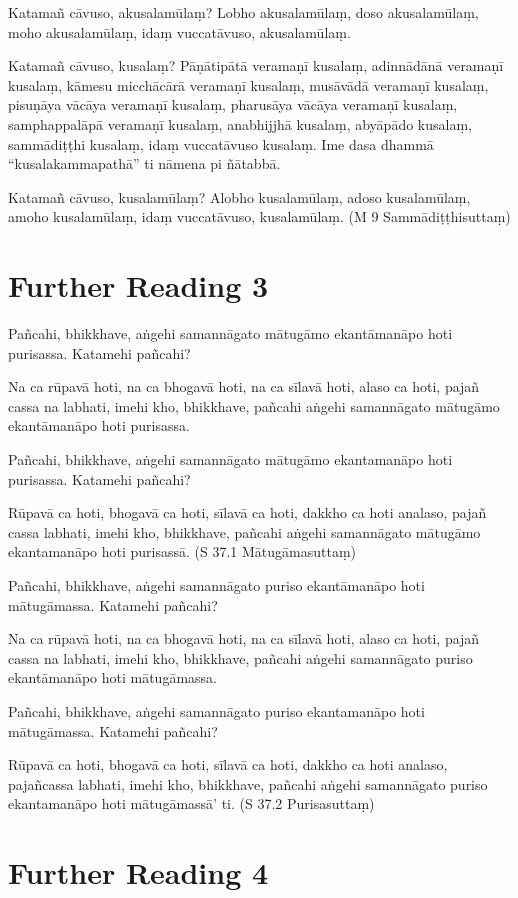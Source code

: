 Katamañ cāvuso, akusalamūlaṃ? Lobho akusalamūlaṃ, doso akusalamūlaṃ, moho akusalamūlaṃ, idaṃ vuccatāvuso, akusalamūlaṃ.

Katamañ cāvuso, kusalaṃ? Pāṇātipātā veramaṇī kusalaṃ, adinnādānā veramaṇī kusalaṃ, kāmesu micchācārā veramaṇī kusalaṃ, musāvādā veramaṇī kusalaṃ, pisuṇāya vācāya veramaṇī kusalaṃ, pharusāya vācāya veramaṇī kusalaṃ, samphappalāpā veramaṇī kusalaṃ, anabhijjhā kusalaṃ, abyāpādo kusalaṃ, sammādiṭṭhi kusalaṃ, idaṃ vuccatāvuso kusalaṃ. Ime dasa dhammā “kusalakammapathā” ti nāmena pi ñātabbā.

Katamañ cāvuso, kusalamūlaṃ? Alobho kusalamūlaṃ, adoso kusalamūlaṃ, amoho kusalamūlaṃ, idaṃ vuccatāvuso, kusalamūlaṃ. (M 9 Sammādiṭṭhisuttaṃ)

\section*{Further Reading 3}

Pañcahi, bhikkhave, aṅgehi samannāgato mātugāmo ekantāmanāpo hoti purisassa. Katamehi pañcahi?

Na ca rūpavā hoti, na ca bhogavā hoti, na ca sīlavā hoti, alaso ca hoti, pajañ cassa na labhati, imehi kho, bhikkhave, pañcahi aṅgehi samannāgato mātugāmo ekantāmanāpo hoti purisassa.

Pañcahi, bhikkhave, aṅgehi samannāgato mātugāmo ekantamanāpo hoti purisassa. Katamehi pañcahi?

Rūpavā ca hoti, bhogavā ca hoti, sīlavā ca hoti, dakkho ca hoti analaso, pajañ cassa labhati, imehi kho, bhikkhave, pañcahi aṅgehi samannāgato mātugāmo ekantamanāpo hoti purisassā. (S 37.1 Mātugāmasuttaṃ)

Pañcahi, bhikkhave, aṅgehi samannāgato puriso ekantāmanāpo hoti mātugāmassa. Katamehi pañcahi?

Na ca rūpavā hoti, na ca bhogavā hoti, na ca sīlavā hoti, alaso ca hoti, pajañ cassa na labhati, imehi kho, bhikkhave, pañcahi aṅgehi samannāgato puriso ekantāmanāpo hoti mātugāmassa.

Pañcahi, bhikkhave, aṅgehi samannāgato puriso ekantamanāpo hoti mātugāmassa. Katamehi pañcahi?

Rūpavā ca hoti, bhogavā ca hoti, sīlavā ca hoti, dakkho ca hoti analaso, pajañcassa labhati, imehi kho, bhikkhave, pañcahi aṅgehi samannāgato puriso ekantamanāpo hoti mātugāmassā’ ti. (S 37.2 Purisasuttaṃ)

\section*{Further Reading 4}

